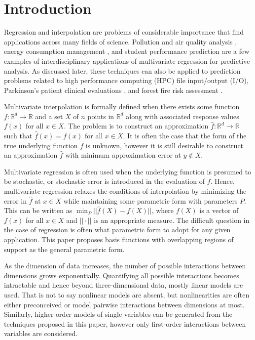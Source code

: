 \section{Introduction}
\label{sec_introduction}

Regression and interpolation are problems of considerable importance that find applications across many fields of science. Pollution and air quality analysis \cite{de2008field}, energy consumption management \cite{lazos2014optimisation}, and student performance prediction \cite{cortez2008using} are a few examples of interdisciplinary applications of multivariate regression for predictive analysis. As discussed later, these techniques can also be applied to prediction problems related to high performance computing (HPC) file input/output (I/O), Parkinson's patient clinical evaluations \cite{tsanas2010accurate}, and forest fire risk assessment \cite{cortez2007data}.

Multivariate interpolation is formally defined when there exists some function $f:\mathbb{R}^d \rightarrow \mathbb{R}$ and a set $X$ of $n$ points in $\mathbb{R}^d$ along with associated response values $f(x)$ for all $x \in X$. The problem is to construct an approximation $\hat f: \mathbb{R}^d \rightarrow \mathbb{R}$ such that $\hat f(x) = f(x)$ for all $x \in X$. It is often the case that the form of the true underlying function $f$ is unknown, however it is still desirable to construct an approximation $\hat f$ with minimum approximation error at $y \notin X$.

Multivariate regression is often used when the underlying function is presumed to be stochastic, or stochastic error is introduced in the evaluation of $f$. Hence, multivariate regression relaxes the conditions of interpolation by minimizing the error in $\hat f$ at $x \in X$ while maintaining some parametric form with parameters $P$. This can be written as $\min_{P} ||\hat f(X) - f(X)||$, where $f(X)$ is a vector of $f(x)$ for all $x \in X$ and $||\cdot||$ is an appropriate measure. The difficult question in the case of regression is often what parametric form to adopt for any given application. This paper proposes basis functions with overlapping regions of support as the general parametric form.

As the dimension of data increases, the number of possible interactions between dimensions grows exponentially. Quantifying all possible interactions becomes intractable and hence beyond three-dimensional data, mostly linear models are used. That is not to say nonlinear models are absent, but nonlinearities are often either preconceived or model pairwise interactions between dimensions at most. Similarly, higher order models of single variables can be generated from the techniques proposed in this paper, however only first-order interactions between variables are considered.


